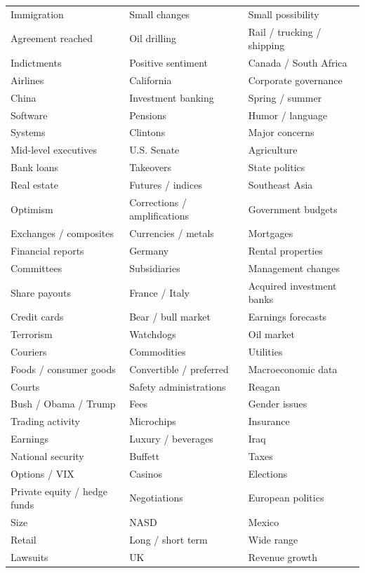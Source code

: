 \begin{longtable}{>{\raggedright\arraybackslash}p{}
                  >{\raggedright\arraybackslash}p{}
                  >{\raggedright\arraybackslash}p{}}
Immigration & Small changes & Small possibility \\
Agreement reached & Oil drilling & Rail / trucking / shipping \\
Indictments & Positive sentiment & Canada / South Africa \\
Airlines & California & Corporate governance \\
China & Investment banking & Spring / summer \\
Software & Pensions & Humor / language \\
Systems & Clintons & Major concerns \\
Mid-level executives & U.S. Senate & Agriculture \\
Bank loans & Takeovers & State politics \\
Real estate & Futures / indices & Southeast Asia \\
Optimism & Corrections / amplifications & Government budgets \\
Exchanges / composites & Currencies / metals & Mortgages \\
Financial reports & Germany & Rental properties \\
Committees & Subsidiaries & Management changes \\
Share payouts & France / Italy & Acquired investment banks \\
Credit cards & Bear / bull market & Earnings forecasts \\
Terrorism & Watchdogs & Oil market \\
Couriers & Commodities & Utilities \\
Foods / consumer goods & Convertible / preferred & Macroeconomic data \\
Courts & Safety administrations & Reagan \\
Bush / Obama / Trump & Fees & Gender issues \\
Trading activity & Microchips & Insurance \\
Earnings & Luxury / beverages & Iraq \\
National security & Buffett & Taxes \\
Options / VIX & Casinos & Elections \\
Private equity / hedge funds & Negotiations & European politics \\
Size & NASD & Mexico \\
Retail & Long / short term & Wide range \\
Lawsuits & UK & Revenue growth \\
\end{longtable}

